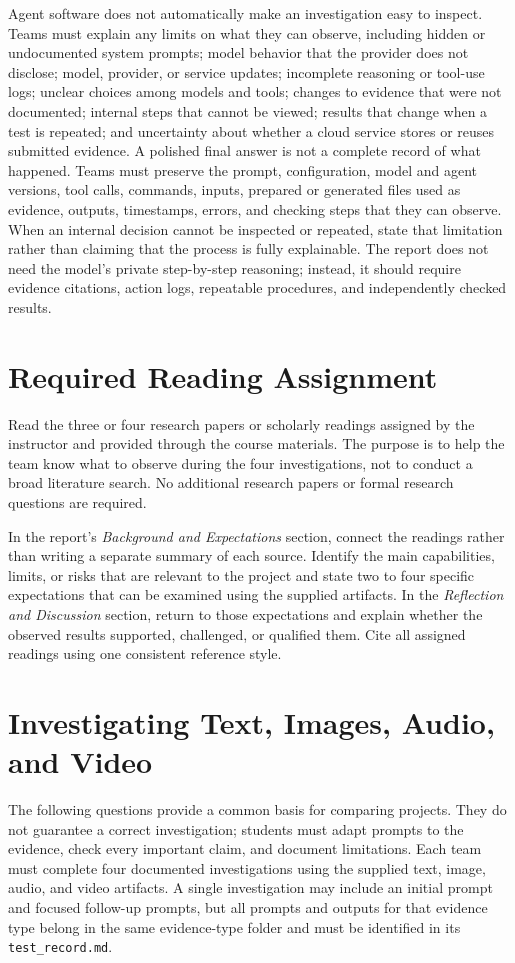 \documentclass[12pt,letterpaper]{article}
\begin{document}
Agent software does not automatically make an investigation easy to inspect. Teams must explain any limits on what they can observe, including hidden or undocumented system prompts; model behavior that the provider does not disclose; model, provider, or service updates; incomplete reasoning or tool-use logs; unclear choices among models and tools; changes to evidence that were not documented; internal steps that cannot be viewed; results that change when a test is repeated; and uncertainty about whether a cloud service stores or reuses submitted evidence. A polished final answer is not a complete record of what happened. Teams must preserve the prompt, configuration, model and agent versions, tool calls, commands, inputs, prepared or generated files used as evidence, outputs, timestamps, errors, and checking steps that they can observe. When an internal decision cannot be inspected or repeated, state that limitation rather than claiming that the process is fully explainable. The report does not need the model's private step-by-step reasoning; instead, it should require evidence citations, action logs, repeatable procedures, and independently checked results.

\section{Required Reading Assignment}
Read the three or four research papers or scholarly readings assigned by the instructor and provided through the course materials. The purpose is to help the team know what to observe during the four investigations, not to conduct a broad literature search. No additional research papers or formal research questions are required.

In the report's \emph{Background and Expectations} section, connect the readings rather than writing a separate summary of each source. Identify the main capabilities, limits, or risks that are relevant to the project and state two to four specific expectations that can be examined using the supplied artifacts. In the \emph{Reflection and Discussion} section, return to those expectations and explain whether the observed results supported, challenged, or qualified them. Cite all assigned readings using one consistent reference style.

\section{Investigating Text, Images, Audio, and Video}
The following questions provide a common basis for comparing projects. They do not guarantee a correct investigation; students must adapt prompts to the evidence, check every important claim, and document limitations. Each team must complete four documented investigations using the supplied text, image, audio, and video artifacts. A single investigation may include an initial prompt and focused follow-up prompts, but all prompts and outputs for that evidence type belong in the same evidence-type folder and must be identified in its \texttt{test\_record.md}.
\end{document}
